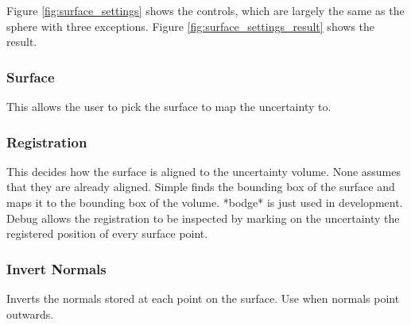 Figure \ref{fig:surface_settings} shows the controls, which are largely the same as the sphere with three exceptions. Figure \ref{fig:surface_settings_result} shows the result.

\subsubsection{Surface}
This allows the user to pick the surface to map the uncertainty to.

\subsubsection{Registration}
This decides how the surface is aligned to the uncertainty volume. None assumes that they are already aligned. Simple finds the bounding box of the surface and maps it to the bounding box of the volume. *bodge* is just used in development. Debug allows the registration to be inspected by marking on the uncertainty the registered position of every surface point.

\subsubsection{Invert Normals}
Inverts the normals stored at each point on the surface. Use when normals point outwards.

